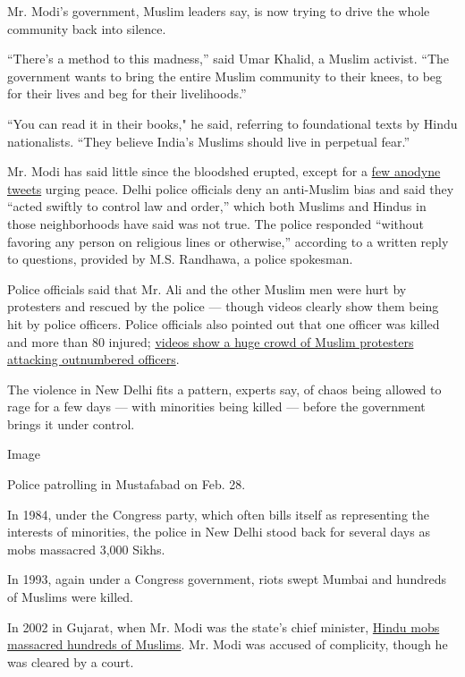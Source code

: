 Mr. Modi's government, Muslim leaders say, is now trying to drive the
whole community back into silence.

``There's a method to this madness,'' said Umar Khalid, a Muslim
activist. ``The government wants to bring the entire Muslim community to
their knees, to beg for their lives and beg for their livelihoods.''

``You can read it in their books," he said, referring to foundational
texts by Hindu nationalists. ``They believe India's Muslims should live
in perpetual fear.''

Mr. Modi has said little since the bloodshed erupted, except for a
\href{https://twitter.com/narendramodi/status/1232581653916155912?lang=en}{few
anodyne tweets} urging peace. Delhi police officials deny an anti-Muslim
bias and said they ``acted swiftly to control law and order,'' which
both Muslims and Hindus in those neighborhoods have said was not true.
The police responded ``without favoring any person on religious lines or
otherwise,'' according to a written reply to questions, provided by M.S.
Randhawa, a police spokesman.

Police officials said that Mr. Ali and the other Muslim men were hurt by
protesters and rescued by the police --- though videos clearly show them
being hit by police officers. Police officials also pointed out that one
officer was killed and more than 80 injured;
\href{https://www.facebook.com/520830984697574/posts/2861380863975896/?vh=e\&d=n}{videos
show a huge crowd of Muslim protesters attacking outnumbered officers}.

The violence in New Delhi fits a pattern, experts say, of chaos being
allowed to rage for a few days --- with minorities being killed ---
before the government brings it under control.

Image

Police patrolling in Mustafabad on Feb. 28.

In 1984, under the Congress party, which often bills itself as
representing the interests of minorities, the police in New Delhi stood
back for several days as mobs massacred 3,000 Sikhs.

In 1993, again under a Congress government, riots swept Mumbai and
hundreds of Muslims were killed.

In 2002 in Gujarat, when Mr. Modi was the state's chief minister,
\href{https://www.nytimes.com/2002/07/27/world/religious-riots-loom-over-indian-politics.html}{Hindu
mobs massacred hundreds of Muslims}. Mr. Modi was accused of complicity,
though he was cleared by a court.

